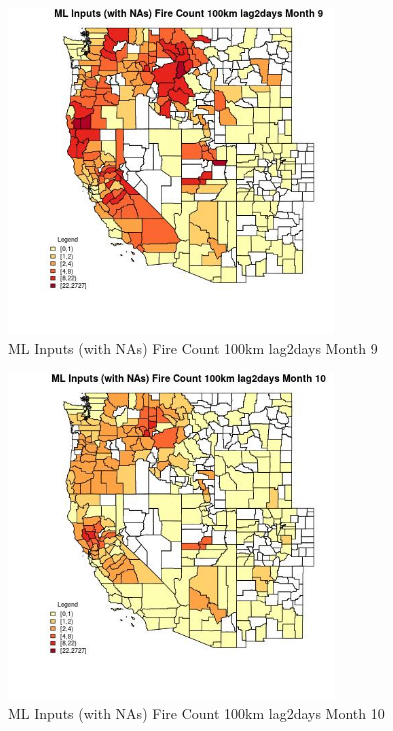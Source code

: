 \begin{figure} 
\centering  
\includegraphics[width=0.77\textwidth]{Code_Outputs/Report_ML_input_PM25_Step4_part_f_de_duplicated_aves_prioritize_24hr_obswNAs_CountyFire_Count_100km_lag2daysmedianMonth9.jpg} 
\caption{\label{fig:Report_ML_input_PM25_Step4_part_f_de_duplicated_aves_prioritize_24hr_obswNAsCountyFire_Count_100km_lag2daysmedianMonth9}ML Inputs (with NAs) Fire Count 100km lag2days Month 9} 
\end{figure} 
 

\begin{figure} 
\centering  
\includegraphics[width=0.77\textwidth]{Code_Outputs/Report_ML_input_PM25_Step4_part_f_de_duplicated_aves_prioritize_24hr_obswNAs_CountyFire_Count_100km_lag2daysmedianMonth10.jpg} 
\caption{\label{fig:Report_ML_input_PM25_Step4_part_f_de_duplicated_aves_prioritize_24hr_obswNAsCountyFire_Count_100km_lag2daysmedianMonth10}ML Inputs (with NAs) Fire Count 100km lag2days Month 10} 
\end{figure} 
 

